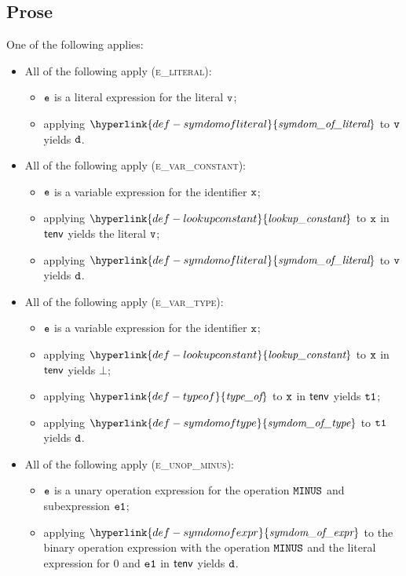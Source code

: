 \documentclass{book}
\newcommand\lookupconstant[0]{\hyperlink{def-lookupconstant}{\textfunc{lookup\_constant}}}
\newcommand\typeof[0]{\hyperlink{def-typeof}{\textfunc{type\_of}}}
\newcommand\symdomoftype[0]{\hyperlink{def-symdomoftype}{\textfunc{symdom\_of\_type}}}
\newcommand\symdomofexpr[0]{\hyperlink{def-symdomofexpr}{\textfunc{symdom\_of\_expr}}}
\newcommand\symdomofliteral[0]{\hyperlink{def-symdomofliteral}{\textfunc{symdom\_of\_literal}}}
\begin{document}
\subsection{Prose}
One of the following applies:
\begin{itemize}
  \item All of the following apply (\textsc{e\_literal}):
  \begin{itemize}
    \item $\texttt{e}$ is a literal expression for the literal $\texttt{v}$;
    \item applying $\symdomofliteral$ to $\texttt{v}$ yields $\texttt{d}$.
  \end{itemize}

  \item All of the following apply (\textsc{e\_var\_constant}):
  \begin{itemize}
    \item $\texttt{e}$ is a variable expression for the identifier $\texttt{x}$;
    \item applying $\lookupconstant$ to $\texttt{x}$ in $\textsf{tenv}$ yields the literal $\texttt{v}$;
    \item applying $\symdomofliteral$ to $\texttt{v}$ yields $\texttt{d}$.
  \end{itemize}

  \item All of the following apply (\textsc{e\_var\_type}):
  \begin{itemize}
    \item $\texttt{e}$ is a variable expression for the identifier $\texttt{x}$;
    \item applying $\lookupconstant$ to $\texttt{x}$ in $\textsf{tenv}$ yields $\bot$;
    \item applying $\typeof$ to $\texttt{x}$ in $\textsf{tenv}$ yields $\texttt{t1}$;
    \item applying $\symdomoftype$ to $\texttt{t1}$ yields $\texttt{d}$.
  \end{itemize}

  \item All of the following apply (\textsc{e\_unop\_minus}):
  \begin{itemize}
    \item $\texttt{e}$ is a unary operation expression for the operation $\texttt{MINUS}$ and subexpression $\texttt{e1}$;
    \item applying $\symdomofexpr$ to the binary operation expression with the operation $\texttt{MINUS}$
          and the literal expression for $0$ and $\texttt{e1}$ in $\textsf{tenv}$ yields $\texttt{d}$.
  \end{itemize}


\end{itemize}
\end{document}
